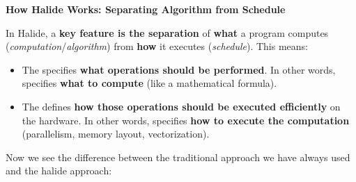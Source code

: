 \highspace
\begin{flushleft}
   \textcolor{Green3}{ \textbf{How Halide Works: Separating Algorithm from Schedule}}
\end{flushleft}
In Halide, a \textbf{key feature is the separation} of \textbf{what} a program computes (\emph{computation}/\emph{algorithm}) from \textbf{how} it executes (\emph{schedule}). This means:
\begin{itemize}
   \item The  specifies \textbf{what operations should be performed}. In other words, specifies \textbf{what to compute} (like a mathematical formula).
   \item The  defines \textbf{how those operations should be executed efficiently} on the hardware. In other words, specifies \textbf{how to execute the computation} (parallelism, memory layout, vectorization).
\end{itemize}
Now we see the difference between the traditional approach we have always used and the halide approach:
